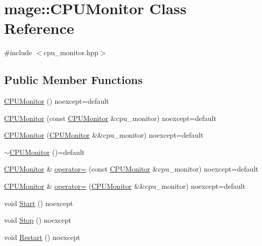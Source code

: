 \hypertarget{classmage_1_1_c_p_u_monitor}{}\section{mage\+:\+:C\+P\+U\+Monitor Class Reference}
\label{classmage_1_1_c_p_u_monitor}


{\ttfamily \#include $<$cpu\+\_\+monitor.\+hpp$>$}

\subsection*{Public Member Functions}
\begin{DoxyCompactItemize}
\item 
\mbox{\hyperlink{classmage_1_1_c_p_u_monitor_ad41542b831ae42cf8dbb206a70535598}{C\+P\+U\+Monitor}} () noexcept=default
\item 
\mbox{\hyperlink{classmage_1_1_c_p_u_monitor_a8d53a4b373c63d074fcb0cb969b3f7cb}{C\+P\+U\+Monitor}} (const \mbox{\hyperlink{classmage_1_1_c_p_u_monitor}{C\+P\+U\+Monitor}} \&cpu\+\_\+monitor) noexcept=default
\item 
\mbox{\hyperlink{classmage_1_1_c_p_u_monitor_a415f77c86323428f233f955249f5b252}{C\+P\+U\+Monitor}} (\mbox{\hyperlink{classmage_1_1_c_p_u_monitor}{C\+P\+U\+Monitor}} \&\&cpu\+\_\+monitor) noexcept=default
\item 
\mbox{\hyperlink{classmage_1_1_c_p_u_monitor_a597ea4b27675a22d3d66a1d817b26652}{$\sim$\+C\+P\+U\+Monitor}} ()=default
\item 
\mbox{\hyperlink{classmage_1_1_c_p_u_monitor}{C\+P\+U\+Monitor}} \& \mbox{\hyperlink{classmage_1_1_c_p_u_monitor_a878cc9fd170e6c34ee28f06591b06eeb}{operator=}} (const \mbox{\hyperlink{classmage_1_1_c_p_u_monitor}{C\+P\+U\+Monitor}} \&cpu\+\_\+monitor) noexcept=default
\item 
\mbox{\hyperlink{classmage_1_1_c_p_u_monitor}{C\+P\+U\+Monitor}} \& \mbox{\hyperlink{classmage_1_1_c_p_u_monitor_af1eacba414b2db72cf13d335f78785cd}{operator=}} (\mbox{\hyperlink{classmage_1_1_c_p_u_monitor}{C\+P\+U\+Monitor}} \&\&cpu\+\_\+monitor) noexcept=default
\item 
void \mbox{\hyperlink{classmage_1_1_c_p_u_monitor_a3f88acbb979f47309fd46f1b507fed09}{Start}} () noexcept
\item 
void \mbox{\hyperlink{classmage_1_1_c_p_u_monitor_a133aaed1df0e84486a6fc748d66615bb}{Stop}} () noexcept
\item 
void \mbox{\hyperlink{classmage_1_1_c_p_u_monitor_ab8b04a64545df631be0f40a54cc49e03}{Restart}} () noexcept

\end{DoxyCompactItemize}
